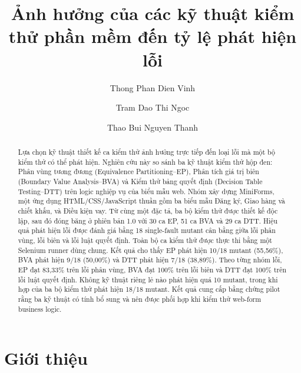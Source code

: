 \documentclass[runningheads]{llncs}
\begin{document}
\title{Ảnh hưởng của các kỹ thuật kiểm thử phần mềm đến tỷ lệ phát hiện lỗi}

\author{Thong Phan Dien Vinh \and Tram Dao Thi Ngoc \and Thao Bui Nguyen Thanh}

\maketitle

\begin{abstract}
Lựa chọn kỹ thuật thiết kế ca kiểm thử ảnh hưởng trực tiếp đến loại lỗi mà một bộ kiểm thử có thể phát hiện. Nghiên cứu này so sánh ba kỹ thuật kiểm thử hộp đen: Phân vùng tương đương (Equivalence Partitioning--EP), Phân tích giá trị biên (Boundary Value Analysis--BVA) và Kiểm thử bảng quyết định (Decision Table Testing--DTT) trên logic nghiệp vụ của biểu mẫu web. Nhóm xây dựng MiniForms, một ứng dụng HTML/CSS/JavaScript thuần gồm ba biểu mẫu Đăng ký, Giao hàng và chiết khấu, và Điều kiện vay. Từ cùng một đặc tả, ba bộ kiểm thử được thiết kế độc lập, sau đó đóng băng ở phiên bản 1.0 với 30 ca EP, 51 ca BVA và 29 ca DTT. Hiệu quả phát hiện lỗi được đánh giá bằng 18 single-fault mutant cân bằng giữa lỗi phân vùng, lỗi biên và lỗi luật quyết định. Toàn bộ ca kiểm thử được thực thi bằng một Selenium runner dùng chung. Kết quả cho thấy EP phát hiện 10/18 mutant (55,56\%), BVA phát hiện 9/18 (50,00\%) và DTT phát hiện 7/18 (38,89\%). Theo từng nhóm lỗi, EP đạt 83,33\% trên lỗi phân vùng, BVA đạt 100\% trên lỗi biên và DTT đạt 100\% trên lỗi luật quyết định. Không kỹ thuật riêng lẻ nào phát hiện quá 10 mutant, trong khi hợp của ba bộ kiểm thử phát hiện 18/18 mutant. Kết quả cung cấp bằng chứng pilot rằng ba kỹ thuật có tính bổ sung và nên được phối hợp khi kiểm thử web-form business logic.

\end{abstract}

\section{Giới thiệu}
\label{sec:introduction}
\end{document}
